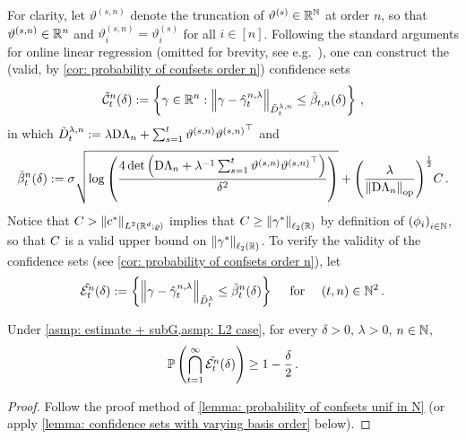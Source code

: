 For clarity, let $\vartheta^{(s,n)}$ denote the truncation of $\vartheta^{(s)}\in\mathbb{R}^{\mathbb{N}}$ at order $n$, so that $\vartheta^{(s,n)}\in\mathbb{R}^{n}$ and $\vartheta^{(s,n)}_i=\vartheta^{(s)}_i$ for all $i\in[n]$.
Following the standard arguments for online linear regression (omitted for brevity, see e.g.\ \cite{abbasi-yadkori_improved_2011,abbasi-yadkori_online_2012}), one can construct the (valid, by \cref{cor: probability of confsets order n}) confidence sets
\begin{align}
    \tilde{\mathcal{C}}_{t}^{n}(\delta):=\left\{\gamma\in\mathbb{R}^{n}: \left\lVert\gamma -\hat \gamma^{n,\lambda}_t\right\rVert_{\tilde{D}_t^{\lambda,n}}\le \tilde{\beta}_{t,n}(\delta)\right\}\label{eq: confidence set fixed order}\,,
\end{align}
in which $\tilde{D}_t^{\lambda,n}:= \lambda\mathrm{D}\Lambda_n + \sum_{s=1}^t \vartheta^{(s,n)}{\vartheta^{(s,n)}}^\top$ and 
\begin{align}
    \tilde{\beta}_{t}^{n}(\delta):=\sigma\sqrt{\log\left(\frac{4\det\left(\mathrm{D}\Lambda_n+\lambda^{-1}\sum_{s=1}^t \vartheta^{(s,n)}{\vartheta^{(s,n)}}^\top\right)}{\delta^2}\right)} +{\left(\frac\lambda{\left\lVert\mathrm{D}\Lambda_n\right\rVert_{\rm op}}\right)}^{\frac12}C\,.
\label{eq: width fixed order}
\end{align}
Notice that $C>\left\lVert c^*\right\rVert_{L^2(\mathbb{R}^d;\varrho)}$ implies that $C\ge \left\lVert\gamma^*\right\rVert_{\ell_2(\mathbb{R})}$ by definition of ${(\phi_i)}_{i\in\mathbb{N}}$, so that $C$ is a valid upper bound on $\left\lVert\gamma^*\right\rVert_{\ell_2(\mathbb{R})}$. To verify the validity of the confidence sets (see \cref{cor: probability of confsets order n}), let 
    \begin{align}
        \tilde{\mathcal{E}_t^{n}}(\delta):=\left\{ \left\lVert\gamma -\hat \gamma^{n,\lambda}_t\right\rVert_{\tilde{D}_t^\lambda}\le \tilde{\beta}_{t}^{n}(\delta) \right\}\quad \mbox{ for }\quad (t,n)\in\mathbb{N}^2\,.\label{eq: event def for fixed order approx}
    \end{align} 

\begin{corollary}\label{cor: probability of confsets order n}
    Under \cref{asmp: estimate + subG,asmp: L2 case}, for every $\delta>0$, $\lambda>0$, $n\in\mathbb{N}$, 
    \[
        \mathbb{P}\left(\bigcap_{t=1}^\infty \tilde{\mathcal{E}_t^{n}}(\delta)\right)\ge 1-\frac\delta2\,.
    \]
\end{corollary}

\begin{proof}
    Follow the proof method of \cref{lemma: probability of confsets unif in N} (or apply \cref{lemma: confidence sets with varying basis order} below).
\end{proof}


